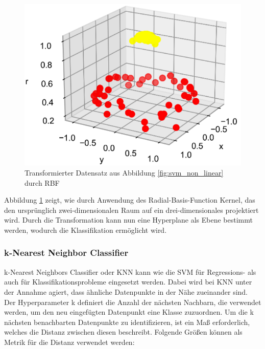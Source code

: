 \begin{figure}[h]
    \centering
    \includegraphics[scale=0.5]{figures/svm_kernel_transformation.png}
    \caption{Transformierter Datensatz aus Abbildung \ref{fig:svm_non_linear} durch RBF}
    \label{fig:svm_transformed}
\end{figure}

Abbildung \ref{fig:svm_transformed} zeigt, wie durch Anwendung des Radial-Basis-Function Kernel, das den ursprünglich zwei-dimensionalen Raum auf ein drei-dimensionales projektiert wird.
Durch die Transformation kann nun eine Hyperplane als Ebene bestimmt werden, wodurch die Klassifikation ermöglicht wird.

\pagebreak

\subsubsection*{k-Nearest Neighbor Classifier}

k-Nearest Neighbors Classifier oder KNN kann wie die SVM für Regressions- als auch für Klassifikationsprobleme eingesetzt werden. Dabei wird bei KNN unter der Annahme agiert, dass ähnliche Datenpunkte in der Nähe zueinander sind.
Der Hyperparameter k definiert die Anzahl der nächsten Nachbarn, die verwendet werden, um den neu eingefügten Datenpunkt eine Klasse zuzuordnen. Um die k nächsten benachbarten Datenpunkte zu identifizieren, ist ein Maß erforderlich, welches die Distanz zwischen diesen beschreibt. 
Folgende Größen können als Metrik für die Distanz verwendet werden:

